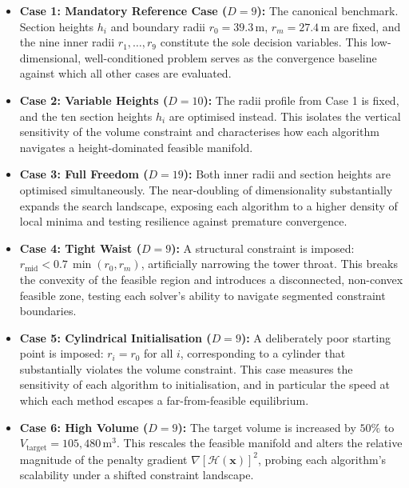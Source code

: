 \begin{itemize}

    \item \textbf{Case 1: Mandatory Reference Case ($D = 9$):}
    The canonical benchmark. Section heights $h_i$ and boundary radii $r_0 = 39.3\,\text{m}$, $r_m = 27.4\,\text{m}$ are fixed, and the nine inner radii $r_1, \dots, r_9$ constitute the sole decision variables. 
	This low-dimensional, well-conditioned problem serves as the convergence baseline against which all other cases are evaluated.

    \item \textbf{Case 2: Variable Heights ($D = 10$):}
    The radii profile from Case 1 is fixed, and the ten section heights $h_i$ are optimised instead. 
	This isolates the vertical sensitivity of the volume constraint and characterises how each algorithm navigates a height-dominated feasible manifold.

    \item \textbf{Case 3: Full Freedom ($D = 19$):}
    Both inner radii and section heights are optimised simultaneously.
	The near-doubling of dimensionality substantially expands the search landscape, exposing each algorithm to a higher density of local minima and testing resilience against premature convergence.

    \item \textbf{Case 4: Tight Waist ($D = 9$):}
    A structural constraint is imposed: $r_{\text{mid}} < 0.7\,\min(r_0, r_m)$, artificially narrowing the tower throat. 
	This breaks the convexity of the feasible region and introduces a disconnected, non-convex feasible zone, testing each solver's ability to navigate segmented constraint boundaries.

    \item \textbf{Case 5: Cylindrical Initialisation ($D = 9$):}
    A deliberately poor starting point is imposed: $r_i = r_0$ for all $i$, corresponding to a cylinder that substantially violates the volume constraint. 
	This case measures the sensitivity of each algorithm to initialisation, and in particular the speed at which each method escapes a far-from-feasible equilibrium.

    \item \textbf{Case 6: High Volume ($D = 9$):}
    The target volume is increased by $50\%$ to $V_{\text{target}} = 105{,}480\,\text{m}^3$. 
	This rescales the feasible manifold and alters the relative magnitude of the penalty gradient $\nabla[\mathcal{H}(\mathbf{x})]^2$, probing each algorithm's scalability under a shifted constraint landscape.


\end{itemize}
